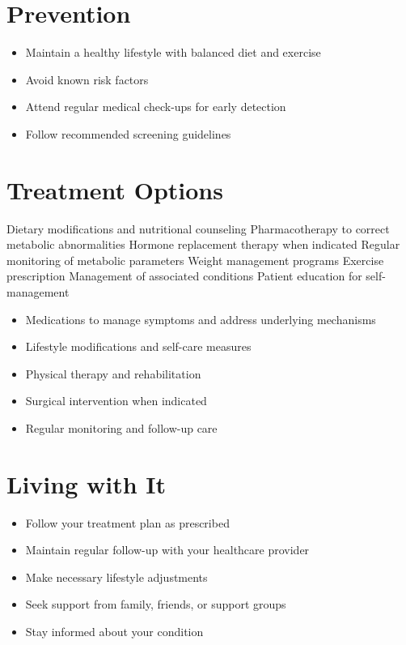 \section{Prevention}
\begin{itemize}[noitemsep]
  \item Maintain a healthy lifestyle with balanced diet and exercise
  \item Avoid known risk factors
  \item Attend regular medical check-ups for early detection
  \item Follow recommended screening guidelines
\end{itemize}
\section{Treatment Options}
Dietary modifications and nutritional counseling Pharmacotherapy to correct metabolic abnormalities Hormone replacement therapy when indicated Regular monitoring of metabolic parameters Weight management programs Exercise prescription Management of associated conditions Patient education for self-management

\begin{itemize}[noitemsep]
  \item Medications to manage symptoms and address underlying mechanisms
  \item Lifestyle modifications and self-care measures
  \item Physical therapy and rehabilitation
  \item Surgical intervention when indicated
  \item Regular monitoring and follow-up care
\end{itemize}
\section{Living with It}
\begin{itemize}[noitemsep]
  \item Follow your treatment plan as prescribed
  \item Maintain regular follow-up with your healthcare provider
  \item Make necessary lifestyle adjustments
  \item Seek support from family, friends, or support groups
  \item Stay informed about your condition
\end{itemize}
